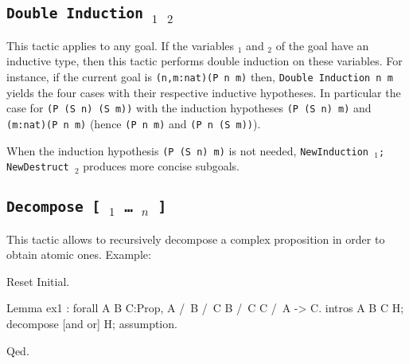 
\subsection {\tt Double Induction \ident$_1$ \ident$_2$}
This tactic applies to any goal. If the variables {\ident$_1$} and {\ident$_2$}
of the goal have an inductive type, then this tactic
performs double induction on these variables.
For instance, if the current goal is \verb+(n,m:nat)(P n m)+ then,
{\tt Double Induction n m} yields the four cases with their respective
inductive hypotheses. In particular the case for
\verb+(P (S n) (S m))+
with the induction hypotheses \verb+(P (S n) m)+ and 
\verb+(m:nat)(P n m)+ (hence \verb+(P n m)+ and \verb+(P n (S m))+).

\Rem When the induction hypothesis \verb+(P (S n) m)+ is not
needed, {\tt NewInduction \ident$_1$; NewDestruct \ident$_2$} produces
more concise subgoals.


\subsection{\tt Decompose [ {\ident$_1$} \dots\ {\ident$_n$} ] \term}
\label{Decompose}
This tactic allows to recursively decompose a
complex proposition in order to obtain atomic ones.
Example: 

\begin{coq_eval}
Reset Initial.
\end{coq_eval}
\begin{coq_example}
Lemma ex1 : forall A B C:Prop, A /\ B /\ C \/ B /\ C \/ C /\ A -> C.
intros A B C H; decompose [and or] H; assumption.
\end{coq_example}
\begin{coq_example*}
Qed.
\end{coq_example*}

